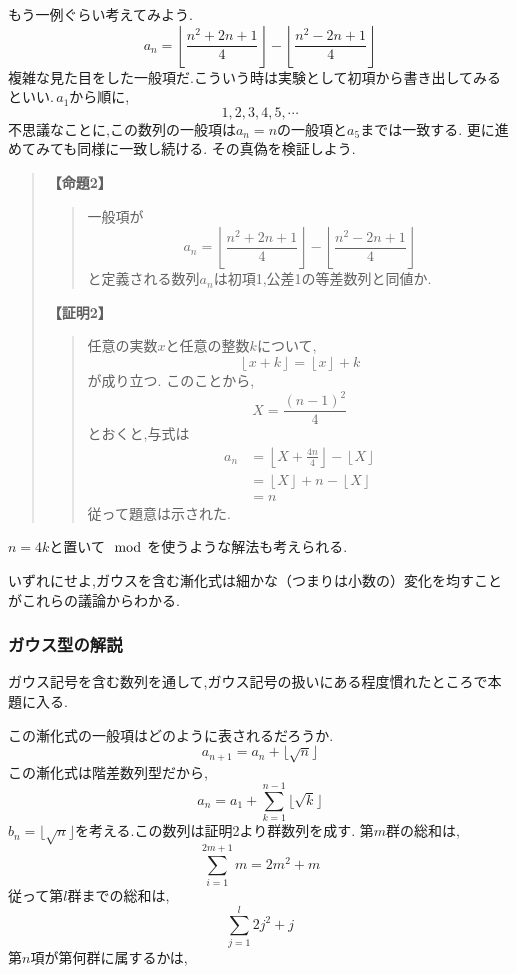 \documentclass[dvipdfmx,a4paper,11pt,fleqn,openany]{jsbook}
\renewcommand{\qed}{\unskip\nobreak\quad\qedsymbol}
\begin{document}
      もう一例ぐらい考えてみよう.
      \[
        a_{n}=\left\lfloor \frac{n^2+2n+1}{4} \right\rfloor -\left\lfloor \frac{n^2-2n+1}{4} \right\rfloor
      \]
      複雑な見た目をした一般項だ.こういう時は実験として初項から書き出してみるといい.\,$a_1$から順に,
      \[
        1,2,3,4,5,\cdots
      \]
      不思議なことに,この数列の一般項は$a_n=n$の一般項と$a_5$までは一致する.
      更に進めてみても同様に一致し続ける.
      その真偽を検証しよう.
            \begin{quote}
        \noindent \textbf{【命題2】}
        \begin{quote}
          一般項が
          \[
            a_{n}=\left\lfloor \frac{n^2+2n+1}{4} \right\rfloor -\left\lfloor \frac{n^2-2n+1}{4} \right\rfloor
          \]
          と定義される数列$a_n$は初項1,公差1の等差数列と同値か.
        \end{quote}

        \noindent \textbf{【証明2】}
        \begin{quote}
          任意の実数$x$と任意の整数$k$について,
          \[
            \left\lfloor x+k \right\rfloor=\left\lfloor x \right\rfloor +k
          \]
          が成り立つ.
          このことから,
          \[
            X=\frac{(n-1)^2}{4}
          \]
          とおくと,与式は
          \begin{align*}  
            a_n&=\left\lfloor X+\frac{4n}{4} \right\rfloor-\left\lfloor X \right\rfloor\\
            &=\left\lfloor X \right\rfloor+n-\left\lfloor X \right\rfloor\\
            &=n
          \end{align*}
          従って題意は示された.\qed
        \end{quote}
      \end{quote}
      $n=4k$と置いて$\mod$を使うような解法も考えられる.
      
      いずれにせよ,ガウスを含む漸化式は細かな（つまりは小数の）変化を均すことがこれらの議論からわかる.
    \subsubsection{ガウス型の解説}
      ガウス記号を含む数列を通して,ガウス記号の扱いにある程度慣れたところで本題に入る.
      
      この漸化式の一般項はどのように表されるだろうか.
      \[
        a_{n+1}=a_n+\lfloor \sqrt{n} \rfloor
      \]
      この漸化式は階差数列型だから,
      \[
        a_n=a_1+\sum_{k=1}^{n-1} \lfloor \sqrt{k} \rfloor
      \]
      $b_n=\lfloor \sqrt{n} \rfloor$を考える.この数列は証明2より群数列を成す.
      第$m$群の総和は,
      \[
        \sum_{i=1}^{2m+1} m=2m^2+m
      \]
      従って第$l$群までの総和は,
      \[
        \sum_{j=1}^{l}  2j^2+j
      \]
      第$n$項が第何群に属するかは,
\end{document}
